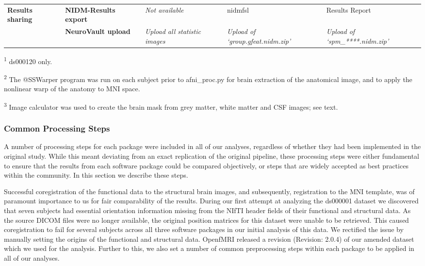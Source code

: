 \begin{onehalfspace}
\begin{table}[htbp]
\begin{threeparttable}
\begin{tabular}{@{}p{}*{4}{L{\tabcolsep\relax}}@{}}
\midrule
\textbf{Results \linebreak sharing} & \textbf{NIDM-Results export} & \textit{Not available} & nidmfsl & Results Report \\
\cmidrule(lr){2-5}
& \textbf{NeuroVault upload} & \textit{Upload all statistic images} & \textit{Upload of `group.gfeat.nidm.zip'} & \textit{Upload of `spm\_****.nidm.zip'}\\
\bottomrule
\end{tabular}
    \begin{tablenotes}
      \small
      \item \textsuperscript{1} ds000120 only.
      \item \textsuperscript{2} The @SSWarper program was run on each subject prior to afni\_proc.py for brain extraction of the anatomical image, and to apply the nonlinear warp of the anatomy to MNI space.
      \item \textsuperscript{3} Image calculator was used to create the brain mask from grey matter, white matter and CSF images; see text. 
    \end{tablenotes}
    \end{threeparttable}
\end{table}
\end{onehalfspace}

\subsubsection{Common Processing Steps}
A number of processing steps for each package were included in all of our analyses, regardless of whether they had been implemented in the original study. While this meant deviating from an exact replication of the original pipeline, these processing steps were either fundamental to ensure that the results from each software package could be compared objectively, or steps that are widely accepted as best practices within the community. In this section we describe these steps.

Successful coregistration of the functional data to the structural brain images, and subsequently, registration to the MNI template, was of paramount importance to us for fair comparability of the results. During our first attempt at analyzing the ds000001 dataset we discovered that seven subjects had essential orientation information missing from the NIfTI header fields of their functional and structural data. As the source DICOM files were no longer available, the original position matrices for this dataset were unable to be retrieved. This caused coregistration to fail for several subjects across all three software packages in our initial analysis of this data. We rectified the issue by manually setting the origins of the functional and structural data. OpenfMRI released a revision (Revision: 2.0.4) of our amended dataset which we used for the analysis. Further to this, we also set a number of common preprocessing steps within each package to be applied in all of our analyses.   

